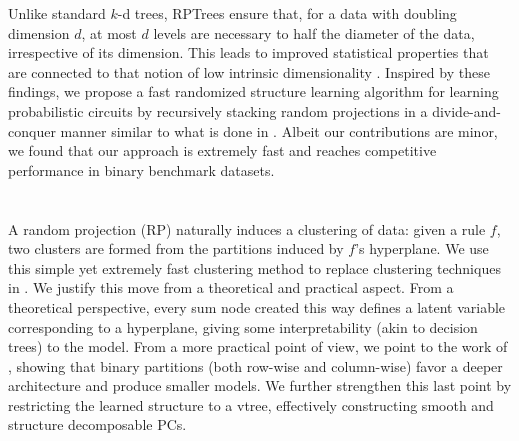 Unlike standard $k$-d trees, RPTrees ensure that, for a data with doubling dimension $d$, at most
$d$ levels are necessary to half the diameter of the data, irrespective of its dimension. This
leads to improved statistical properties that are connected to that notion of low intrinsic
dimensionality \citep{dasgupta08b,dhesi10}. Inspired by these findings, we propose a fast
randomized structure learning algorithm for learning probabilistic circuits by recursively stacking
random projections in a divide-and-conquer manner similar to what is done in .
Albeit our contributions are minor, we found that our approach is extremely fast and reaches
competitive performance in binary benchmark datasets.

\section{}

A random projection (RP) naturally induces a clustering of data: given a rule $f$, two clusters are
formed from the partitions induced by $f$'s hyperplane. We use this simple yet extremely fast
clustering method to replace clustering techniques in . We justify this move
from a theoretical and practical aspect. From a theoretical perspective, every sum node created
this way defines a latent variable corresponding to a hyperplane, giving some interpretability
(akin to decision trees) to the model. From a more practical point of view, we point to the work
of \citet{vergari15}, showing that binary partitions (both row-wise and column-wise) favor a deeper
architecture and produce smaller models. We further strengthen this last point by restricting the
learned structure to a vtree, effectively constructing smooth and structure decomposable PCs.

